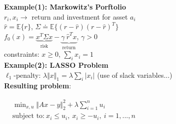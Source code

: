 \documentclass[a4paper]{article}
\begin{document}
\begin{multicols}{2}
    \noindent
    \textbf{Example(1): Markowitz's Porftolio}\\
    $r_i, x_i\to$ return and investment for asset $a_i$\\
    $\hat{r}=\mathbb{E}\{r\}$, $\Sigma\doteq\mathbb{E}\{(r-\hat{r})(r-\hat{r})^T\}$\\
    $f_0(x)=\underbrace{x^T\Sigma{x}}_{\text{risk}}-\underbrace{\gamma\ \hat{r}^T{x}}_{\text{return}}$, $\gamma>0$\\
    constraints: $x\ge0$, $\sum_{i}{x_i}=1$
    \newcolumn\\
    \textbf{Example(2): LASSO Problem}\\
    $\ell_1$-penalty: $\lambda{\Vert{x}\Vert_1}=\lambda\sum_{i} \vert x_i \vert$ (use of slack variables...) \\
    \textbf{Resulting problem}:
    \vspace{-0.3em}
    \begin{center}
        $\begin{aligned}
            &\min_{x,u} {\Vert Ax-y \Vert_2^2+\lambda\sum_{i=1}^n{u_i}}\\
            &\text{subject to:} \ x_i\le{u_i},  \ x_i\ge{-u_i}, \ i=1,..., n
        \end{aligned}$
    \end{center}
\end{multicols}
\end{document}
